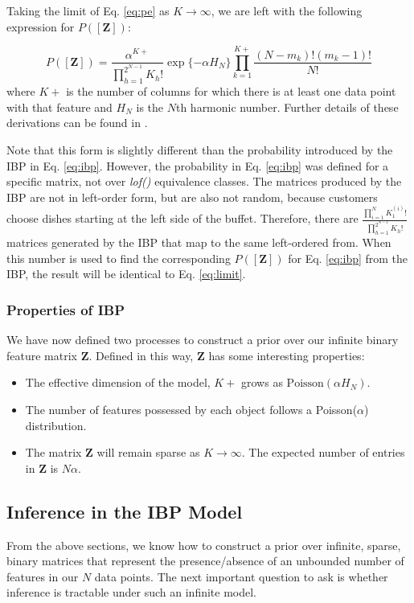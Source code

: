 \documentclass[twoside]{article}
\begin{document}
Taking the limit of Eq. \ref{eq:pe} as $K \to \infty$, we are left with the following expression for $P([\mathbf{Z}])$:

\begin{equation}
    P([\mathbf{Z}]) = \frac{\alpha^{K+}}{\prod_{h = 1}^{2^{N-1}}K_h!} \exp\{-\alpha H_N\} \prod_{k = 1}^{K+} \frac{(N-m_k)!(m_k-1)!}{N!}
    \label{eq:limit}
\end{equation}
where $K+$ is the number of columns for which there is at least one data point with that feature and $H_N$ is the $N$th harmonic number. Further details of these derivations can be found in \citet{Griffiths2011}.

Note that this form is slightly different than the probability introduced by the IBP in Eq. \ref{eq:ibp}. However, the probability in Eq. \ref{eq:ibp} was defined for a specific matrix, not over \textit{lof()} equivalence classes.  The matrices produced by the IBP are not in left-order form, but are also not random, because customers choose dishes starting at the left side of the buffet. Therefore, there are $\frac{\prod_{i=1}^N K_1^{(i)}!}{\prod_{h=1}^{2^{N-1}} K_h!}$ matrices generated by the IBP that map to the same left-ordered from. When this number is used to find the corresponding $P([\mathbf{Z}])$ for Eq. \ref{eq:ibp} from the IBP, the result will be identical to Eq. \ref{eq:limit}. 

\subsubsection{Properties of IBP}
We have now defined two processes to construct a prior over our infinite binary feature matrix $\mathbf{Z}$. Defined in this way, $\mathbf{Z}$ has some interesting properties:
\begin{itemize}
    \item The effective dimension of the model, $K+$ grows as $\text{Poisson}(\alpha H_N)$.
    \item The number of features possessed by each object follows a Poisson($\alpha$) distribution.
    \item The matrix $\mathbf{Z}$ will remain sparse as $K \to \infty$. The expected number of entries in $\mathbf{Z}$ is $N\alpha$.
\end{itemize}

\subsection{Inference in the IBP Model}
\label{sec:gibbs}
From the above sections, we know how to construct a prior over infinite, sparse, binary matrices that represent the presence/absence of an unbounded number of features in our $N$ data points. The next important question to ask is whether inference is tractable under such an infinite model. 
\end{document}
